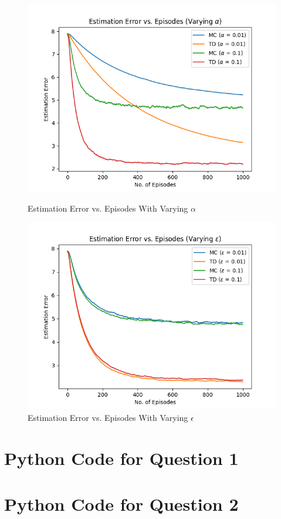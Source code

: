 \documentclass[12pt]{article}
\begin{document}
\begin{figure}[H]
  \centering
  \begin{minipage}[b]{0.45\textwidth}
    \includegraphics[width=\textwidth]{figures/2e3_alpha.png}
    \caption{Estimation Error vs. Episodes With Varying \(\alpha\)}
    \label{figure:2e3_alpha}
  \end{minipage}
  \hspace{3em}
  \begin{minipage}[b]{0.45\textwidth}
    \includegraphics[width=\textwidth]{figures/2e3_epsilon.png}
    \caption{Estimation Error vs. Episodes With Varying \(\epsilon\)}
    \label{figure:2e3_epsilon}
  \end{minipage}
\end{figure}

\newpage

\newpage
\appendixpage
\appendix
\section{Python Code for Question 1}
\label{appendix:q1}

\section{Python Code for Question 2}

\label{appendix:q2}
\end{document}

